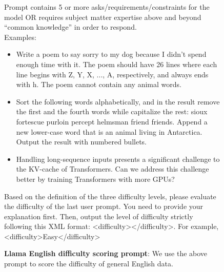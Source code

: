 \begin{figure}
\begin{framed}
Prompt contains 5 or more asks/requirements/constraints for the model OR requires subject matter expertise above and beyond “common knowledge” in order to respond. \\

Examples:
\begin{itemize}
\item Write a poem to say sorry to my dog because I didn't spend enough time with it. The poem should have 26 lines where each line begins with Z, Y, X, ..., A, respectively, and always ends with h. The poem cannot contain any animal words.
\item Sort the following words alphabetically, and in the result remove the first and the fourth words while capitalize the rest: sioux fortescue purloin percept helmsman friend friends. Append a new lower-case word that is an animal living in Antarctica. Output the result with numbered bullets.
\item Handling long-sequence inputs presents a significant challenge to the KV-cache of Transformers.  Can we address this challenge better by training Transformers with more GPUs?
\end{itemize}

Based on the definition of the three difficulty levels, please evaluate the difficulty of the last user prompt. You need to provide your explanation first. Then, output the level of difficulty strictly following this XML format: <difficulty></difficulty>. For example, <difficulty>Easy</difficulty>

\end{framed}

\caption{\textbf{Llama English difficulty scoring prompt}: We use the above prompt to score the difficulty of general English data.}
\label{fig:llama_difficulty_helpful_prompt}
\end{figure}
